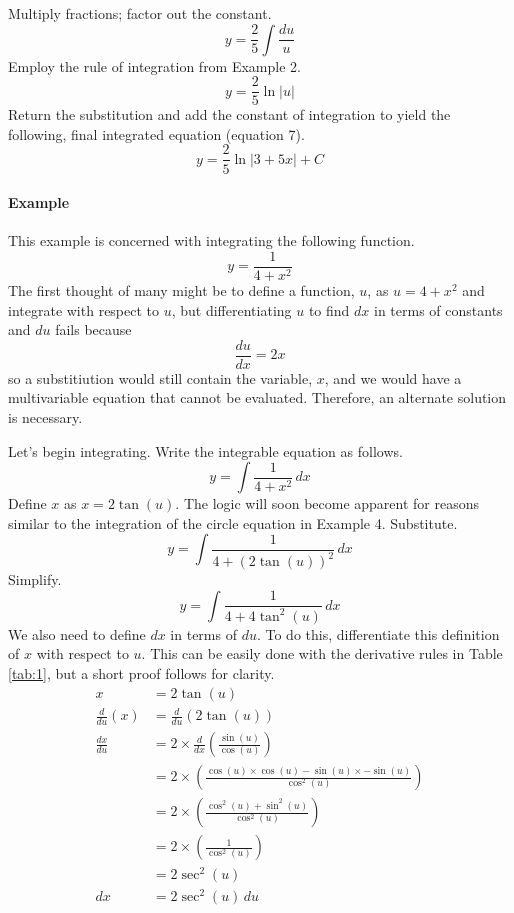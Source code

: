 \documentclass{article}
\newcounter{example}%
\newcommand{\ex}{\stepcounter{example} \paragraph{Example \theexample}}
\begin{document}
Multiply fractions; factor out the constant.
\begin{equation*}
    y=\frac{2}{5}\int \frac{du}{u}
\end{equation*}
Employ the rule of integration from Example 2.
\begin{equation*}
    y=\frac{2}{5}\ln|u|
\end{equation*}
Return the substitution and add the constant of integration to yield the following, final integrated equation (equation 7).
\setcounter{equation}{6}
\begin{equation}
    y=\frac{2}{5}\ln|3+5x|+C
\end{equation}
\ex This example is concerned with integrating the following function.$$y=\frac{1}{4+x^2}$$
The first thought of many might be to define a function, $u$, as $u=4+x^2$ and integrate with respect to $u$, but differentiating $u$ to find $dx$ in terms of constants and $du$ fails because$$\frac{du}{dx}=2x$$so a substitiution would still contain the variable, $x$, and we would have a multivariable equation that cannot be evaluated. Therefore, an alternate solution is necessary.\par
Let's begin integrating. Write the integrable equation as follows.
\begin{equation*}
    y=\int \frac{1}{4+x^2}\, dx
\end{equation*}
Define $x$ as $x=2\tan(u)$. The logic will soon become apparent for reasons similar to the integration of the circle equation in Example 4. Substitute.
\begin{equation*}
    y=\int \frac{1}{4+(2\tan(u))^2}\, dx
\end{equation*}
Simplify.
\begin{equation*}
    y=\int \frac{1}{4+4\tan^2(u)}\, dx
\end{equation*}
We also need to define $dx$ in terms of $du$. To do this, differentiate this definition of $x$ with respect to $u$. This can be easily done with the derivative rules in Table \ref{tab:1}, but a short proof follows for clarity.
\begin{align*}
    x &= 2\tan(u)\\
    \frac{d}{du}(x) &= \frac{d}{du}(2\tan(u))\\
    \frac{dx}{du} &= 2\times\frac{d}{dx}\left(\frac{\sin(u)}{\cos(u)}\right)\\
    &= 2\times\left(\frac{\cos(u)\times\cos(u)-\sin(u)\times -\sin(u)}{\cos^2(u)}\right)\\
    &= 2\times\left(\frac{\cos^2(u)+\sin^2(u)}{\cos^2(u)}\right)\\
    &= 2\times\left(\frac{1}{\cos^2(u)}\right)\\
    &= 2\sec^2(u)\\
    dx &= 2\sec^2(u)\, du
\end{align*}
\end{document}

